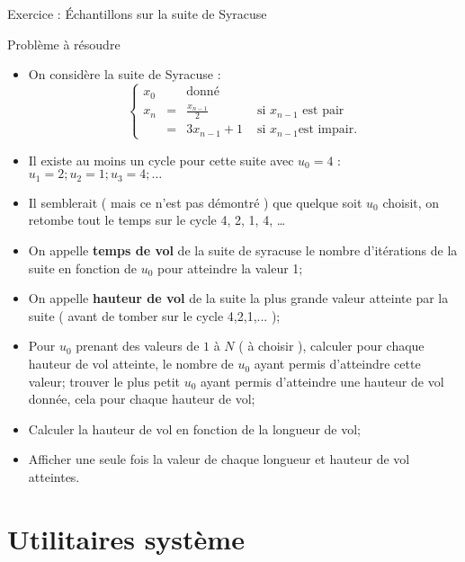 \documentclass[handout,10pt]{beamer}
\begin{document}
\begin{frame}[fragile]{Exercice : \'Echantillons sur la suite de Syracuse}
\tiny
 \begin{block}{Problème à résoudre}
  \begin{itemize}
   \item On considère la suite de Syracuse : 
   \begin{equation}\left\{\begin{array}{lccr} x_{0} & & \mbox{donné} & \\
                                                                     x_{n} & = & \frac{x_{n-1}}{2} & \mbox{ si } x_{n-1} \mbox{ est pair}\\
                                                                           & = & 3x_{n-1}+1 & \mbox{ si } x_{n-1} \mbox{est impair.}
                                                                    \end{array}\right. \end{equation}
\item Il existe au moins un cycle pour cette suite  avec $u_{0} = 4$ : $u_{1} = 2; u_{2} = 1; u_{3} = 4;\ldots$ 
\item Il semblerait ( mais ce n'est pas démontré ) que quelque soit $u_{0}$ choisit, on retombe tout le temps
           sur le cycle 4, 2, 1, 4, \ldots
\item On appelle \textbf{temps de vol} de la suite de syracuse le nombre d'itérations de la suite en fonction de $u_{0}$ pour atteindre la valeur 1;
\item On appelle \textbf{hauteur de vol} de la suite la plus grande valeur atteinte par la suite ( avant de tomber sur le cycle 4,2,1,... );
\item Pour $u_{0}$ prenant des valeurs de $1$ à $N$ ( à choisir ), calculer pour chaque hauteur de vol atteinte, le nombre de $u_{0}$ ayant permis d'atteindre cette
valeur; trouver le plus petit $u_{0}$ ayant permis d'atteindre une hauteur de vol donnée, cela pour chaque hauteur de vol;
\item Calculer la hauteur de vol en fonction de la longueur de vol;
\item Afficher une seule fois la valeur de chaque longueur et hauteur de vol atteintes.
 \end{itemize}
 \end{block}
\end{frame}

\section{Utilitaires système}
\end{document}

